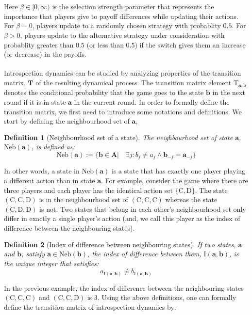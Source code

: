 \documentclass[11pt]{article}
\theoremstyle{plainCl1}
\newtheorem{definition}{Definition}
\theoremstyle{plainCl2}
\newcommand{\A}{\mathbf{A}}
\newcommand{\abf}{\mathbf{a}}
\newcommand{\bbf}{\mathbf{b}}
\newcommand{\T}{\mathbf{T}}
\newcommand{\C}{\mathrm{C}}
\newcommand{\D}{\mathrm{D}}
\begin{document}
\\ \\ \noindent Here $\beta \in [0,\infty)$ is the selection strength parameter that represents the importance that players give to payoff differences while updating their actions. For $\beta = 0$, players update to a randomly chosen strategy with probablity $0.5$. For $\beta > 0$, players update to the alternative strategy under consideration with probablity greater than $0.5$ (or less than $0.5$) if the switch gives them an increase (or decrease) in the payoffs. \\ \\ 
\noindent Introspection dynamics can be studied by analyzing properties of the transition matrix, $\T$ of the resulting dynamical process. The transition matrix element $\mathrm{T}_{\abf,\bbf}$ denotes the conditional probability that the game goes to the state $\bbf$ in the next round if it is in state $\abf$ in the current round. In order to formally define the transition matrix, we first need to introduce some notations and definitions. We start by defining the neighbourhood set of $\abf$,

\begin{definition}[Neighbourhood set of a state] The neighbourhood set of state $\abf$, $\mathrm{Neb}(\abf)$, is defined as:
\begin{equation}
\mathrm{Neb}(\abf) := \{\bbf \in \A  \big| \quad \exists j:  b_{j} \neq a_{j} \land \bbf_{-j} = \abf_{-j}  \}
\label{Eq:neighbourhood-states}
\end{equation} 
\label{Def:neighbourhood-states}
\end{definition} 
\noindent In other words, a state in $\mathrm{Neb}(\abf)$ is a state that has exactly one player playing a different action than in state $\abf$. For example, consider the game where there are  three players and each player has the identical action set $\{\C, \D \}$.  The state $(\C,\C,\D)$ is in the neighbourhood set of $(\C,\C,\C)$ whereas the state $(\C,\D,\D)$ is not. Two states that belong in each other's neighbourhood set only differ in exactly a single player's action (and, we call this player as the index of difference between the neighbouring states).

\begin{definition} [Index of difference between neighbouring states] If two states, $\abf$ and $\bbf$, satisfy $\abf \in \mathrm{Neb}(\bbf)$, the index of difference between them, $\mathrm{I}(\abf, \bbf)$, is the unique integer that satisfies:
\begin{equation}
a_{\mathrm{I}(\abf, \bbf)} \neq b_{\mathrm{I}(\abf, \bbf)}
\end{equation} 
\label{Def:index-of-difference}
\end{definition} 
\noindent In the previous example, the index of difference between the neighbouring states $(\C,\C,\C)$ and $(\C,\C,\D)$ is $3$. Using the above definitions, one can formally define the transition matrix of introspection dynamics by:
\end{document}
